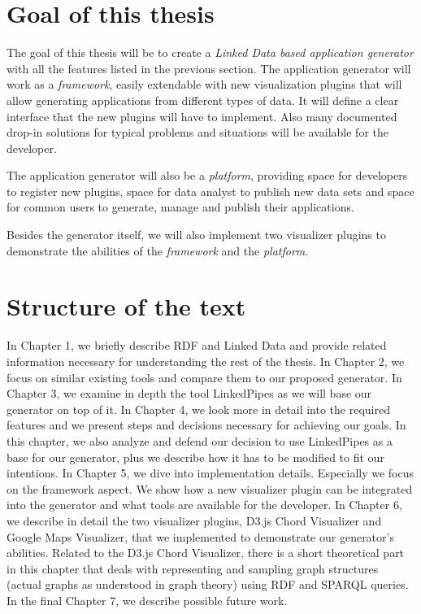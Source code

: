 \section*{Goal of this thesis}

The goal of this thesis will be to create a \emph{Linked Data based application generator} with all the features listed in the previous section. The application generator will work as a \textit{framework}, easily extendable with new visualization plugins that will allow generating applications from different types of data. It will define a clear interface that the new plugins will have to implement. Also many documented drop-in solutions for typical problems and situations will be available for the developer.

The application generator will also be a \textit{platform}, providing space for developers to register new plugins, space for data analyst to publish new data sets and space for common users to generate, manage and publish their applications.

Besides the generator itself, we will also implement two visualizer plugins to demonstrate the abilities of the \textit{framework} and the \textit{platform}.

\section*{Structure of the text}

In Chapter 1, we briefly describe RDF and Linked Data and provide related information necessary for understanding the rest of the thesis. In Chapter 2, we focus on similar existing tools and compare them to our proposed generator. In Chapter 3, we examine in depth the tool LinkedPipes as we will base our generator on top of it.  In Chapter 4, we look more in detail into the required features and we present steps and decisions necessary for achieving our goals. In this chapter, we also analyze and defend our decision to use LinkedPipes as a base for our generator, plus we describe how it has to be modified to fit our intentions. In Chapter 5, we dive into implementation details. Especially we focus on the framework aspect. We show how a new visualizer plugin can be integrated into the generator and what tools are available for the developer. In Chapter 6, we describe in detail the two visualizer plugins, D3.js Chord Visualizer and Google Maps Visualizer, that we implemented to demonstrate our generator's abilities. Related to the D3.js Chord Visualizer, there is a short theoretical part in this chapter that deals with representing and sampling graph structures (actual graphs as understood in graph theory) using RDF and SPARQL queries. In the final Chapter 7, we describe possible future work.